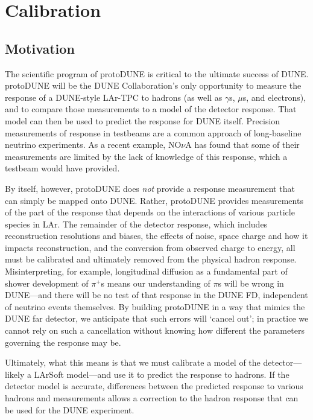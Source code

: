 
\section{Calibration}
\subsection{Motivation}


	The scientific program of protoDUNE is critical to the ultimate success
of DUNE.  protoDUNE will be the DUNE Collaboration's only opportunity to
measure the response of a DUNE-style LAr-TPC to hadrons (as well as $\gamma$s,
$\mu$s, and electrons), and to compare those measurements to a model of the
detector response. That model can then be used to predict the response for DUNE
itself.  Precision measurements of response in testbeams are a common approach
of long-baseline neutrino experiments. As a recent example, NO{$\nu$}A has
found that some of their measurements are limited by the lack of knowledge of
this response, which a testbeam would have provided.
	
	By itself, however, protoDUNE does {\it not} provide a response
measurement that can simply be mapped onto DUNE.  Rather, protoDUNE provides
measurements of the part of the response that depends on the interactions of
various particle species in LAr.  The remainder of the detector response, which
includes reconstruction resolutions and biases, the effects of noise, space
charge and how it impacts reconstruction, and the conversion from observed
charge to energy, all must be calibrated and ultimately removed from the
physical hadron response.  Misinterpreting, for example, longitudinal diffusion
as a fundamental part of shower development of $\pi^+$s means our understanding
of $\pi$s will be wrong in DUNE---and there will be no test of that response in
the DUNE FD, independent of neutrino events themselves.  By building protoDUNE
in a way that mimics the DUNE far detector, we anticipate that such errors will
`cancel out'; in practice we cannot rely on such a cancellation without knowing
how different the parameters governing the response may be.

	Ultimately, what this means is that we must calibrate a model of the
detector---likely a LArSoft model---and use it to predict the response to
hadrons.  If the detector model is accurate, differences between the predicted
response to various hadrons and measurements allows a correction to the hadron
response that can be used for the DUNE experiment.  

